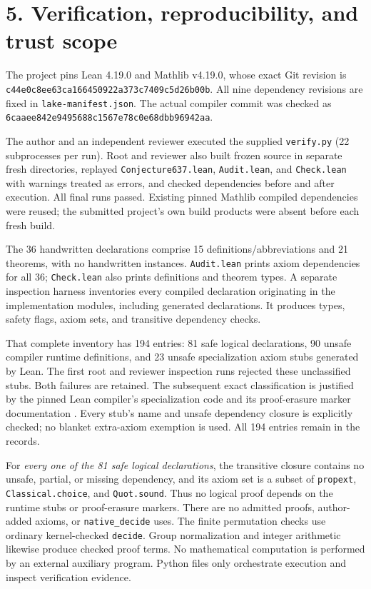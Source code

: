 \documentclass[10pt]{article}
\newcommand{\lean}[1]{\nolinkurl{#1}}
\begin{document}
\newpage
\section*{5. Verification, reproducibility, and trust scope}
The project pins Lean 4.19.0 and Mathlib v4.19.0, whose exact Git revision is
\lean{c44e0c8ee63ca166450922a373c7409c5d26b00b}. All nine dependency revisions
are fixed in \lean{lake-manifest.json}. The actual compiler commit was checked
as \lean{6caaee842e9495688c1567e78c0e68dbb96942aa}.

The author and an independent reviewer executed the supplied \lean{verify.py}
(22 subprocesses per run). Root and reviewer also built frozen source in
separate fresh directories, replayed \lean{Conjecture637.lean},
\lean{Audit.lean}, and \lean{Check.lean} with warnings treated as errors,
and checked dependencies before and after execution. All final runs passed.
Existing pinned Mathlib compiled dependencies were reused; the submitted
project's own build products were absent before each fresh build.

The 36 handwritten declarations comprise 15 definitions/abbreviations and
21 theorems, with no handwritten instances. \lean{Audit.lean} prints axiom
dependencies for all 36; \lean{Check.lean} also prints definitions and theorem
types. A separate inspection harness inventories every compiled declaration
originating in the implementation modules, including generated declarations.
It produces types, safety flags, axiom sets, and transitive dependency checks.

That complete inventory has 194 entries: 81 safe logical declarations,
90 unsafe compiler runtime definitions, and 23 unsafe specialization axiom
stubs generated by Lean. The first root and reviewer inspection runs rejected
these unclassified stubs. Both failures are retained. The subsequent exact
classification is justified by the pinned Lean compiler's specialization code
\cite{compiler} and its proof-erasure marker documentation \cite{prelude}.
Every stub's name and unsafe dependency closure is explicitly checked; no
blanket extra-axiom exemption is used. All 194 entries remain in the records.

For \emph{every one of the 81 safe logical declarations}, the transitive closure
contains no unsafe, partial, or missing dependency, and its axiom set is a
subset of \lean{propext}, \lean{Classical.choice}, and \lean{Quot.sound}.
Thus no logical proof depends on the runtime stubs or proof-erasure markers.
There are no admitted proofs, author-added axioms, or \lean{native_decide} uses.
The finite permutation checks use ordinary kernel-checked \lean{decide}.
Group normalization and integer arithmetic likewise produce checked proof terms.
No mathematical computation is performed by an external auxiliary program.
Python files only orchestrate execution and inspect verification evidence.
\end{document}
